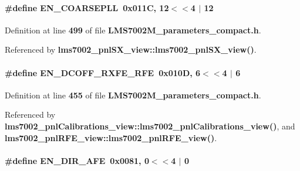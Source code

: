 \paragraph[{E\+N\+\_\+\+C\+O\+A\+R\+S\+E\+P\+LL}]{\setlength{\rightskip}{0pt plus 5cm}\#define E\+N\+\_\+\+C\+O\+A\+R\+S\+E\+P\+LL~0x011\+C, 12$<$$<$4 $\vert$  12}\label{LMS7002M__parameters__compact_8h_ad132850c1978fc4a42103fa3d19e7b2b}


Definition at line {\bf 499} of file {\bf L\+M\+S7002\+M\+\_\+parameters\+\_\+compact.\+h}.



Referenced by {\bf lms7002\+\_\+pnl\+S\+X\+\_\+view\+::lms7002\+\_\+pnl\+S\+X\+\_\+view()}.

\paragraph[{E\+N\+\_\+\+D\+C\+O\+F\+F\+\_\+\+R\+X\+F\+E\+\_\+\+R\+FE}]{\setlength{\rightskip}{0pt plus 5cm}\#define E\+N\+\_\+\+D\+C\+O\+F\+F\+\_\+\+R\+X\+F\+E\+\_\+\+R\+FE~0x010\+D, 6$<$$<$4 $\vert$  6}\label{LMS7002M__parameters__compact_8h_adfe34454b87ab17924dcf9fb30cc263c}


Definition at line {\bf 455} of file {\bf L\+M\+S7002\+M\+\_\+parameters\+\_\+compact.\+h}.



Referenced by {\bf lms7002\+\_\+pnl\+Calibrations\+\_\+view\+::lms7002\+\_\+pnl\+Calibrations\+\_\+view()}, and {\bf lms7002\+\_\+pnl\+R\+F\+E\+\_\+view\+::lms7002\+\_\+pnl\+R\+F\+E\+\_\+view()}.

\paragraph[{E\+N\+\_\+\+D\+I\+R\+\_\+\+A\+FE}]{\setlength{\rightskip}{0pt plus 5cm}\#define E\+N\+\_\+\+D\+I\+R\+\_\+\+A\+FE~0x0081, 0$<$$<$4 $\vert$  0}\label{LMS7002M__parameters__compact_8h_acc2fb1f3fb87e86044c66a5886468e5c}


